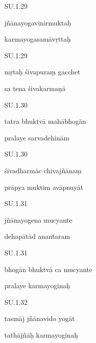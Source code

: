 \documentclass{article}
\begin{document}
	    
		SU.1.29 
    
	    
		jñānayogavinirmuktaḥ 
    
	    
		karmayogasamāvṛttaḥ 
    

    
	
	    
		SU.1.29 
    
	    
		mṛtaḥ śivapuraṃ gacchet 
    
	    
		sa tena śivakarmaṇā 
    

    
	
	    
		SU.1.30 
    
	    
		tatra bhuktvā mahābhogān 
    
	    
		pralaye sarvadehinām 
    

    
	
	    
		SU.1.30 
    
	    
		śivadharmāc chivajñānaṃ 
    
	    
		prāpya muktim avāpnuyāt 
    

    
	
	    
		SU.1.31 
    
	    
		jñānayogena mucyante 
    
	    
		dehapātād anantaram 
    

    
	
	    
		SU.1.31 
    
	    
		bhogān bhuktvā ca mucyante 
    
	    
		pralaye karmayoginaḥ 
    

    
	
	    
		SU.1.32 
    
	    
		tasmāj jñānavido yogāt 
    
	    
		tathājñāḥ karmayoginaḥ 
    
\end{document}
